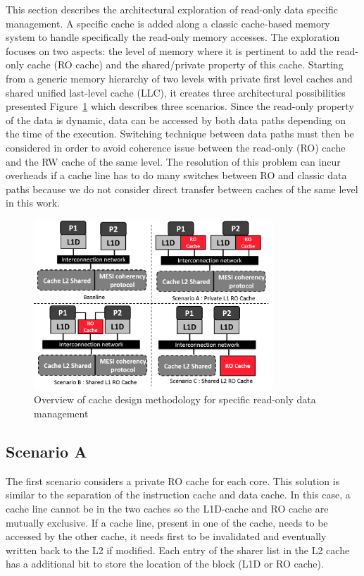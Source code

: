 \documentclass[sigconf]{acmart}
\begin{document}
This section describes the architectural exploration of read-only data
specific management. A specific cache is added along a classic
cache-based memory system to handle specifically the read-only memory
accesses. The exploration focuses on two aspects: the level of memory
where it is pertinent to add the read-only cache (RO cache) and the
shared/private property of this cache. Starting from a generic memory
hierarchy of two levels with private first level caches and shared
unified last-level cache (LLC), it creates three architectural
possibilities presented Figure~\ref{architecture} which describes
three scenarios. Since the read-only property of the data is dynamic,
data can be accessed by both data paths depending on the time of the
execution. Switching technique between data paths must then be
considered in order to avoid coherence issue between the read-only
(RO) cache and the RW cache of the same level. The resolution of this
problem can incur overheads if a cache line has to do many switches
between  RO and  classic data paths because we do not consider
direct transfer between caches of the same level in this work.


\begin{figure}
    \centering
    \includegraphics[width=9cm]{./images/architecture.png}
    \caption{Overview of cache design methodology for specific read-only data management}
    \label{architecture}
\end{figure}

\subsection{Scenario A}

The first scenario considers a private RO cache for each core. This solution is similar to the separation of the instruction cache and data cache. In this case, a cache line cannot be in the two caches so the L1D-cache and RO cache are mutually exclusive. If a cache line, present in one of the cache, needs to be accessed by the other cache, it needs first to be invalidated and eventually written back to the L2 if modified. Each entry of the sharer list in the L2 cache has a additional bit to store the location of the block (L1D or RO cache). 
\end{document}
